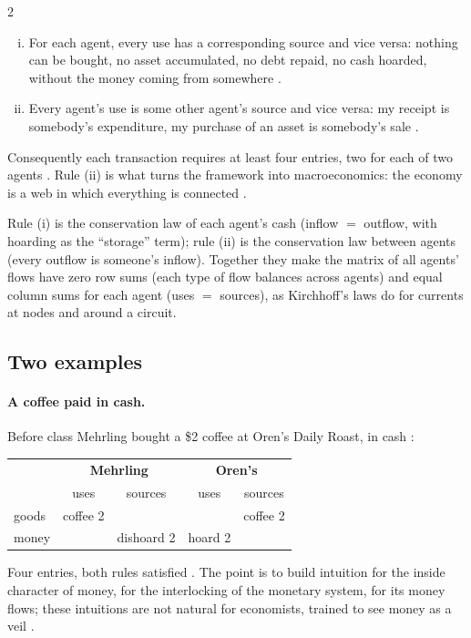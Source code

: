 \begin{paracol}{2}
\begin{proposition}\label{prop:mv-rules}
\leavevmode
\begin{enumerate}[(i)]
  \item For each agent, every use has a corresponding source and vice versa: nothing can be bought, no asset accumulated, no debt
        repaid, no cash hoarded, without the money coming from somewhere .
  \item Every agent's use is some other agent's source and vice versa: my receipt is somebody's expenditure, my purchase of an asset is
        somebody's sale .
\end{enumerate}
Consequently each transaction requires at least four entries, two for each of two agents . Rule (ii) is what turns the
framework into macroeconomics: the economy is a web in which everything is connected .
\end{proposition}

\begin{intuition}
Rule (i) is the conservation law of each agent's cash (inflow $=$ outflow, with hoarding as the ``storage'' term); rule (ii) is the
conservation law between agents (every outflow is someone's inflow). Together they make the matrix of all agents' flows have zero row sums
(each type of flow balances across agents) and equal column sums for each agent (uses $=$ sources), as Kirchhoff's laws do for currents at
nodes and around a circuit.
\end{intuition}

\subsection{Two examples}\label{sec:mv-examples}
\paragraph{A coffee paid in cash.} Before class Mehrling bought a \$2 coffee at Oren's Daily Roast, in cash :
\begin{center}
\begin{tabular}{l|cc|cc}
 & \multicolumn{2}{c|}{\textbf{Mehrling}} & \multicolumn{2}{c}{\textbf{Oren's}}\\
 & uses & sources & uses & sources\\\hline
goods & coffee 2 & & & coffee 2\\\hline
money & & dishoard 2 & hoard 2 & \\
\end{tabular}
\end{center}
Four entries, both rules satisfied . The point is to build intuition for the inside character of money,
for the interlocking of the monetary system, for its money flows; these intuitions are not natural for economists, trained to see money as a
veil .


\end{paracol}

